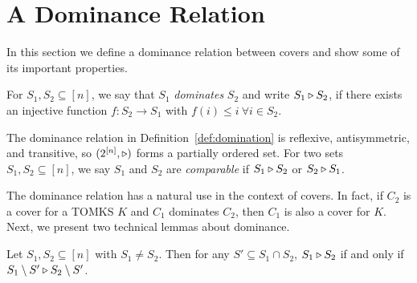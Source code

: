 \section{A Dominance Relation}
\label{sec:dominance}

In this section we define a dominance relation between covers and show some of its important properties.

\begin{definition}[Dominance]
\label{def:domination}
For $S_1, S_2 \subseteq [n]$, we say that $S_1$ \emph{dominates} $S_2$ and write $S_1 \triangleright S_2$, if there exists an injective function $f: S_2 \to S_1$ with $f(i) \leq i \ \forall i \in S_2$. %
\end{definition}

The dominance relation in Definition~\ref{def:domination} is reflexive, antisymmetric, and transitive, so $(2^{[n]}, \triangleright)$ forms a partially ordered set. 
For two sets $S_1, S_2 \subseteq [n]$, we say $S_1$ and $S_2$ are \emph{comparable} if $S_1 \triangleright S_2$ or $S_2 \triangleright S_1$.

The dominance relation has a natural use in the context of covers.
In fact, if $C_2$ is a cover for a TOMKS $K$ and $C_1$ dominates $C_2$, then $C_1$ is also a cover for $K$. 
Next, we present two technical lemmas about dominance.

\begin{lemma}
\label{lem: domination_minus_intersection}
Let $S_1, S_2 \subseteq [n]$ with $S_1 \neq S_2$.
Then for any $S' \subseteq S_1 \cap S_2$, $S_1 \triangleright S_2$ if and only if $S_1 \setminus S' \triangleright S_2 \setminus S'$.
\end{lemma}


